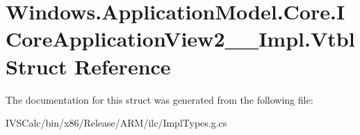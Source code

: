 \hypertarget{struct_windows_1_1_application_model_1_1_core_1_1_i_core_application_view2_____impl_1_1_vtbl}{}\section{Windows.\+Application\+Model.\+Core.\+I\+Core\+Application\+View2\+\_\+\+\_\+\+Impl.\+Vtbl Struct Reference}
\label{struct_windows_1_1_application_model_1_1_core_1_1_i_core_application_view2_____impl_1_1_vtbl}


The documentation for this struct was generated from the following file\+:\begin{DoxyCompactItemize}
\item 
I\+V\+S\+Calc/bin/x86/\+Release/\+A\+R\+M/ilc/Impl\+Types.\+g.\+cs\end{DoxyCompactItemize}
